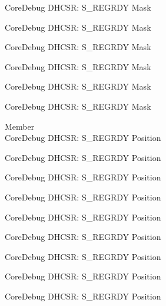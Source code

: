 \begin{DoxyRefList}
\label{deprecated__deprecated000833}%
%
Core\+Debug DHCSR\+: S\+\_\+\+REGRDY Mask 

\label{deprecated__deprecated000918}%
%
Core\+Debug DHCSR\+: S\+\_\+\+REGRDY Mask 

\label{deprecated__deprecated000975}%
%
Core\+Debug DHCSR\+: S\+\_\+\+REGRDY Mask 

\label{deprecated__deprecated001051}%
%
Core\+Debug DHCSR\+: S\+\_\+\+REGRDY Mask 

\label{deprecated__deprecated001138}%
%
Core\+Debug DHCSR\+: S\+\_\+\+REGRDY Mask 

\label{deprecated__deprecated001240}%
%
Core\+Debug DHCSR\+: S\+\_\+\+REGRDY Mask  
\item[Member \doxylink{group___c_m_s_i_s___core_debug_ga20a71871ca8768019c51168c70c3f41d}{Core\+Debug\+\_\+\+DHCSR\+\_\+\+S\+\_\+\+REGRDY\+\_\+\+Pos} ]\hfill \\
\label{deprecated__deprecated000027}%
%
Core\+Debug DHCSR\+: S\+\_\+\+REGRDY Position 

\label{deprecated__deprecated000119}%
%
Core\+Debug DHCSR\+: S\+\_\+\+REGRDY Position 

\label{deprecated__deprecated000173}%
%
Core\+Debug DHCSR\+: S\+\_\+\+REGRDY Position 

\label{deprecated__deprecated000258}%
%
Core\+Debug DHCSR\+: S\+\_\+\+REGRDY Position 

\label{deprecated__deprecated000315}%
%
Core\+Debug DHCSR\+: S\+\_\+\+REGRDY Position 

\label{deprecated__deprecated000391}%
%
Core\+Debug DHCSR\+: S\+\_\+\+REGRDY Position 

\label{deprecated__deprecated000478}%
%
Core\+Debug DHCSR\+: S\+\_\+\+REGRDY Position 

\label{deprecated__deprecated000580}%
%
Core\+Debug DHCSR\+: S\+\_\+\+REGRDY Position 

\label{deprecated__deprecated000686}%
%
Core\+Debug DHCSR\+: S\+\_\+\+REGRDY Position 


\end{DoxyRefList}
